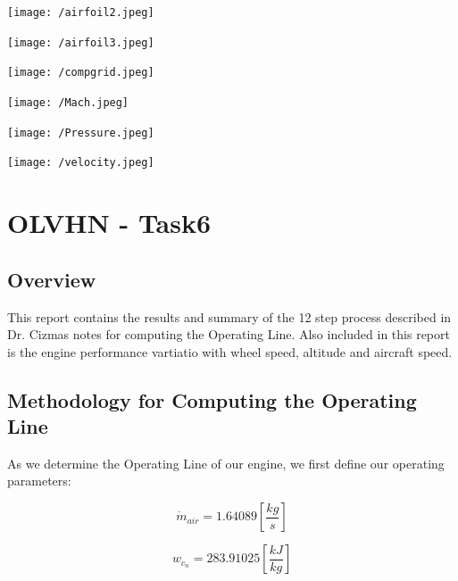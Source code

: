 \documentclass[titlepage]{article}
\begin{document}
\begin{center}
  \texttt{[image: /airfoil2.jpeg]}
\end{center}

\begin{center}
  \texttt{[image: /airfoil3.jpeg]}
\end{center}

\begin{center}
  \texttt{[image: /compgrid.jpeg]}
\end{center}

\begin{center}
  \texttt{[image: /Mach.jpeg]}
\end{center}

\begin{center}
  \texttt{[image: /Pressure.jpeg]}
\end{center}

\begin{center}
  \texttt{[image: /velocity.jpeg]}
\end{center}




\vspace*{2cm}

\section{OLVHN - Task6}

\subsection{Overview}
This report contains the results and summary of the 12 step process described in Dr. Cizmas notes for computing the Operating Line. 
Also included in this report is the engine performance vartiatio with wheel speed, altitude and aircraft speed.

\subsection{Methodology for Computing the Operating Line}
As  we determine the Operating Line of our engine, we first define our 
operating parameters:

\begin{equation}
    \dot{m}_{air} = 1.64089 \left[\frac{kg}{s} \right]
  \end{equation}
  
  \begin{equation}
    w_{c_{n}} = 283.91025 \left[\frac{kJ}{kg}\right]
  \end{equation}
  
\end{document}
